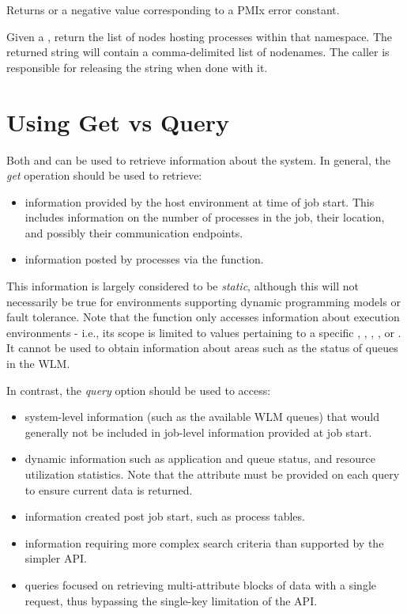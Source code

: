 Returns  or a negative value corresponding to a PMIx error constant.

\descr

Given a , return the list of nodes hosting processes within that namespace.
The returned string will contain a comma-delimited list of nodenames.
The caller is responsible for releasing the string when done with it.



\section{Using Get vs Query}
\label{chap:api_job_mgmt:query}

Both  and  can be used to retrieve information about the system. In general, the \emph{get} operation should be used to retrieve:

\begin{itemize}
\item information provided by the host environment at time of job start. This includes information on the number of processes in the job, their location, and possibly their communication endpoints.
\item information posted by processes via the  function.
\end{itemize}

This information is largely considered to be \emph{static}, although this will not necessarily be true for environments supporting dynamic programming models or fault tolerance. Note that the  function only accesses information about execution environments - i.e., its scope is limited to values pertaining to a specific , , , , or . It cannot be used to obtain information about areas such as the status of queues in the \ac{WLM}.

In contrast, the \emph{query} option should be used to access:

\begin{itemize}
\item system-level information (such as the available \ac{WLM} queues) that would generally not be included in job-level information provided at job start.
\item dynamic information such as application and queue status, and resource utilization statistics. Note that the  attribute must be provided on each query to ensure current data is returned.
\item information created post job start, such as process tables.
\item information requiring more complex search criteria than supported by the simpler  \ac{API}.
\item queries focused on retrieving multi-attribute blocks of data with a single request, thus bypassing the single-key limitation of the  \ac{API}.
\end{itemize}

